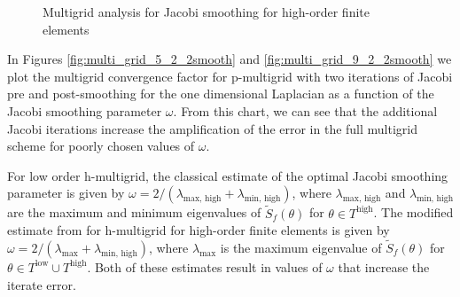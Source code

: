 \documentclass[review]{siamart190516}
\begin{document}
\begin{figure}[!tbp]
  \centering
  \caption{Multigrid analysis for Jacobi smoothing for high-order finite elements}
\end{figure}

In Figures \ref{fig:multi_grid_5_2_2smooth} and \ref{fig:multi_grid_9_2_2smooth} we plot the multigrid convergence factor for p-multigrid with two iterations of Jacobi pre and post-smoothing for the one dimensional Laplacian as a function of the Jacobi smoothing parameter $\omega$.
From this chart, we can see that the additional Jacobi iterations increase the amplification of the error in the full multigrid scheme for poorly chosen values of $\omega$.

For low order h-multigrid, the classical estimate of the optimal Jacobi smoothing parameter is given by $\omega = 2 / \left( \lambda_{\text{max, high}} + \lambda_{\text{min, high}} \right)$, where $\lambda_{\text{max, high}}$ and $\lambda_{\text{min, high}}$ are the maximum and minimum eigenvalues of $\tilde{S}_f \left( \theta \right)$ for $\theta \in T^{\text{high}}$.
The modified estimate from \cite{he2020two} for h-multigrid for high-order finite elements is given by $\omega = 2 / \left( \lambda_{\text{max}} + \lambda_{\text{min, high}} \right)$, where $\lambda_{\text{max}}$ is the maximum eigenvalue of $\tilde{S}_f \left( \theta \right)$ for $\theta \in T^{\text{low}} \cup T^{\text{high}}$.
Both of these estimates result in values of $\omega$ that increase the iterate error.
\end{document}

